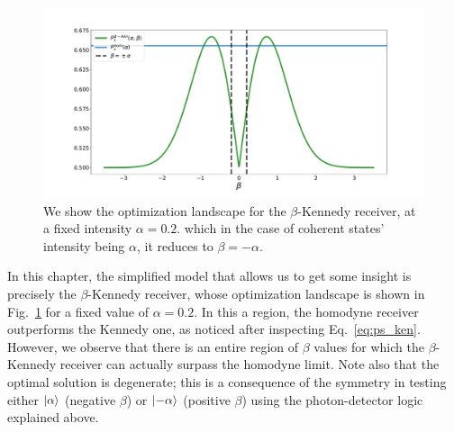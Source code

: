 \begin{figure}[t!]
    \centering
    \includegraphics[width=.9\textwidth]{Figures/kenn_landscape.pdf}
    \caption{We show the optimization landscape for the $\beta$-Kennedy receiver, at a fixed intensity $\alpha=0.2$. which in the case of coherent states' intensity being $\alpha$, it reduces to $\beta = -\alpha$.}
    \label{fig:optiland}
\end{figure}

In this chapter, the simplified model that allows us to get some insight is precisely the $\beta$-Kennedy receiver, whose optimization landscape is shown in Fig.~\ref{fig:optiland} for a fixed value of $\alpha=0.2$. In this a region, the homodyne receiver outperforms the Kennedy one, as noticed after inspecting Eq.~\ref{eq:ps_ken}. However, we observe that there is an entire region of $\beta$ values for which the $\beta$-Kennedy receiver can actually surpass the homodyne limit. Note also that the optimal solution is degenerate; this is a consequence of the symmetry in testing either $\ket{\alpha}$ (negative $\beta$) or $\ket{-\alpha}$ (positive $\beta$) using the photon-detector logic explained above.

